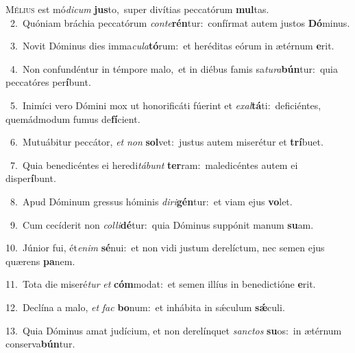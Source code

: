 \lettrine{\initial\textcolor{\initialcolor}{M}}{élius} est mó\-\textit{di}\-\textit{cum} \textbf{jus}\-to,~\star super divítias peccatórum \textbf{mul}\-tas.\\
{\numbfont\textcolor{\numbcolor}{~2.}}~Quóniam bráchia peccatórum \textit{con}\-\textit{te}\textbf{rén}tur:~\star confírmat autem justos \textbf{Dó}\-minus.\par
{\numbfont\textcolor{\numbcolor}{~3.}}~Novit Dóminus dies imma\-\textit{cu}\-\textit{la}\textbf{tó}rum:~\star et heréditas eórum in ætérnum \textbf{e}\-rit.\par
{\numbfont\textcolor{\numbcolor}{~4.}}~Non confundéntur in témpore malo,~\dagger et in diébus famis sa\-\textit{tu}\-\textit{ra}\textbf{bún}tur:~\star quia peccatóres per\-\textbf{í}\-bunt.\par
{\numbfont\textcolor{\numbcolor}{~5.}}~Inimíci vero Dómini mox ut honorificáti fúerint et \textit{ex}\-\textit{al}\textbf{tá}ti:~\star deficiéntes, quemádmodum fumus de\-\textbf{fí}\-cient.\par
{\numbfont\textcolor{\numbcolor}{~6.}}~Mutuábitur peccátor, \textit{et} \textit{non} \textbf{sol}\-vet:~\star justus autem miserétur et \textbf{trí}\-buet.\par
{\numbfont\textcolor{\numbcolor}{~7.}}~Quia benedicéntes ei heredi\-\textit{tá}\-\textit{bunt} \textbf{ter}\-ram:~\star maledicéntes autem ei disper\-\textbf{í}\-bunt.\par
{\numbfont\textcolor{\numbcolor}{~8.}}~Apud Dóminum gressus hóminis \textit{di}\-\textit{ri}\textbf{gén}tur:~\star et viam ejus \textbf{vo}\-let.\par
{\numbfont\textcolor{\numbcolor}{~9.}}~Cum cecíderit non \textit{col}\-\textit{li}\textbf{dé}tur:~\star quia Dóminus suppónit manum \textbf{su}\-am.\par
{\numbfont\textcolor{\numbcolor}{10.}}~Júnior fui, ét\-\textit{e}\-\textit{nim} \textbf{sé}\-nui:~\star et non vidi justum derelíctum, nec semen ejus quærens \textbf{pa}\-nem.\par
{\numbfont\textcolor{\numbcolor}{11.}}~Tota die miseré\textit{tur} \textit{et} \textbf{cóm}\-modat:~\star et semen illíus in benedictióne \textbf{e}\-rit.\par
{\numbfont\textcolor{\numbcolor}{12.}}~Declína a malo, \textit{et} \textit{fac} \textbf{bo}\-num:~\star et inhábita in sǽculum \textbf{sǽ}\-culi.\par
{\numbfont\textcolor{\numbcolor}{13.}}~Quia Dóminus amat judícium, et non derelínquet \textit{sanc}\-\textit{tos} \textbf{su}\-os:~\star in ætérnum conserva\-\textbf{bún}\-tur.\par
